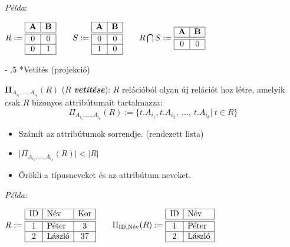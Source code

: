 \documentclass[tikz,12pt,margin=0px]{article}
\makeatletter
\renewcommand\paragraph{%
	\@startsection{paragraph}{4}{0mm}%
	{-\baselineskip}%
	{.5\baselineskip}%
	{\normalfont\normalsize\bfseries}}
\makeatother
\begin{document}
    \noindent \textit{Példa}:
    \begin{center}
        $R := \begin{array}{|c|c|}
             \hline
                \text{\textbf{A}} & \text{\textbf{B}} \\ \hline \hline
                0 & 0 \\ \hline
                0 & 1 \\ \hline
            \end{array} \qquad S := \begin{array}{|c|c|}
            \hline
                \text{\textbf{A}} & \text{\textbf{B}} \\ \hline \hline
                0 & 0 \\ \hline
                1 & 0 \\ \hline
            \end{array} \qquad
            R \bigcap S := \begin{array}{|c|c|}
             \hline
                \text{\textbf{A}} & \text{\textbf{B}} \\ \hline \hline
                0 & 0 \\ \hline
        \end{array}$
    \end{center}

	\paragraph*{Vetítés (projekció)}

    $\boldsymbol{\Pi}_{A_{i_1}, \ldots, A_{i_k}}(R)$ ($R$ \emph{\textbf{vetítése}}): $R$ relációból olyan új relációt hoz létre, amelyik csak $R$ bizonyos attribútumait tartalmazza:
    \[
        \Pi_{A_{i_1}, \ldots, A_{i_k}}(R) := \Big\{t.A_{i_1}, t.A_{i_2},\ \ldots,\ t.A_{i_k} \big|\ t \in R \Big\}
    \]
    \begin{itemize}
        \item Számít az attribútumok sorrendje. (rendezett lista)
        \item $\Big|\Pi_{A_{i_1}, \ldots, A_{i_k}}(R)\Big| < \Big|R\Big|$
        \item Örökli a típusneveket és az attribútum neveket.
   \end{itemize}

   \noindent \textit{Példa:}

    $R := \begin{array}{|c|l|c|}
        \hline
        \text{ID} & \text{Név} & \text{Kor} \\ \hline \hline
        1 & \text{Péter} & 3  \\ \hline
        2 & \text{László} & 37 \\ \hline
    \end{array} \qquad \Pi_{\text{ID}, \text{Név}}(R) :=
    \begin{array}{|c|l|}
        \hline
        \text{ID} & \text{Név} \\ \hline \hline
        1 & \text{Péter}  \\ \hline
        2 & \text{László} \\ \hline
    \end{array}
    $
\end{document}
